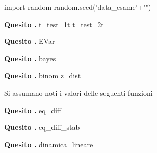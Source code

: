 \documentclass[11pt,twoside,a4paper]{article}
\newcounter{compito}
\newcounter{foglio}
\newcounter{quesito}
\newenvironment{quesito}{\par\noindent\textbf{Quesito \thequesito.\/}}{\addtocounter{quesito}{1}}
\begin{document}
\begin{pycode}
import random
random.seed('data_esame'+"\studente")
\end{pycode}


\addtocounter{compito}{1}
\setcounter{foglio}{1}
\setcounter{quesito}{1}
\rhead{\student}


\vfill
\setcounter{foglio}{1}
\begin{quesito}
t_test_1t
t_test_2t
\end{quesito}
\vfill
\begin{quesito}
EVar
\end{quesito}
\vfill

\clearpage
\begin{quesito}
bayes
\end{quesito}
\vfill
\begin{quesito}
binom
z_dist
\end{quesito}
\vfill
{\hrulefill\scriptsize

Si assumano noti i valori delle seguenti funzioni




}


\clearpage\setcounter{foglio}{2}
\begin{quesito}
eq_diff
\end{quesito}
\vfill

\clearpage
\begin{quesito}
eq_diff_stab
\end{quesito}
\vfill

\clearpage\setcounter{foglio}{3}
\begin{quesito}
dinamica_lineare
\end{quesito}
\vfill
\end{document}
